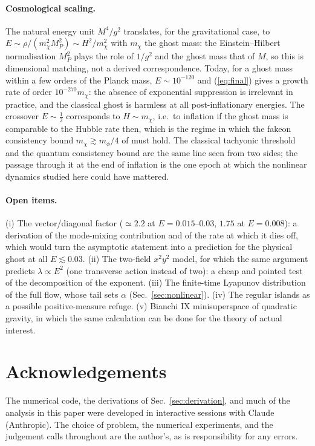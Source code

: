 \documentclass[11pt,a4paper]{article}
\begin{document}
\paragraph{Cosmological scaling.} The natural energy unit $M^4/g^2$ translates, for the
gravitational case, to $E\sim\rho/(m_\chi^2M_P^2)\sim H^2/m_\chi^2$ with $m_\chi$ the ghost mass:
the Einstein--Hilbert normalisation $M_P^2$ plays the role of $1/g^2$ and the ghost mass that of
$M$, so this is dimensional matching, not a derived correspondence. Today, for a ghost mass
within a few orders of the Planck mass,
$E\sim10^{-120}$ and (\ref{eq:final}) gives a growth rate of order $10^{-270}m_\chi$: the absence
of exponential suppression is irrelevant in practice, and the classical ghost is harmless at all
post-inflationary energies. The crossover $E\sim\tfrac12$ corresponds to $H\sim m_\chi$, i.e.\ to
inflation if the ghost mass is comparable to the Hubble rate then, which is the regime in which
the fakeon consistency bound $m_\chi\gtrsim m_\phi/4$ of \cite{ABP20} must hold. The classical
tachyonic threshold and the quantum consistency bound are the same line seen from two sides; the
passage through it at the end of inflation is the one epoch at which the nonlinear dynamics
studied here could have mattered.

\paragraph{Open items.} (i) The vector/diagonal factor ($\simeq2.2$ at $E=0.015$--$0.03$,
$1.75$ at $E=0.008$): a derivation of the mode-mixing contribution and of the rate at which it
dies off, which would turn the asymptotic statement into a prediction for the physical ghost at
all $E\lesssim0.03$. (ii) The two-field $x^2y^2$ model, for which the same argument predicts
$\lambda\propto E^{2}$ (one transverse action instead of two): a cheap and pointed test of the
decomposition of the exponent. (iii) The finite-time Lyapunov distribution of the full flow,
whose tail sets $\alpha$ (Sec.~\ref{sec:nonlinear}). (iv) The regular islands as a possible
positive-measure refuge. (v) Bianchi IX minisuperspace of quadratic gravity, in which the same
calculation can be done for the theory of actual interest.

\section*{Acknowledgements}
The numerical code, the derivations of Sec.~\ref{sec:derivation}, and much of the analysis in
this paper were developed in interactive sessions with Claude (Anthropic). The choice of problem,
the numerical experiments, and the judgement calls throughout are the author's, as is
responsibility for any errors.
\end{document}
